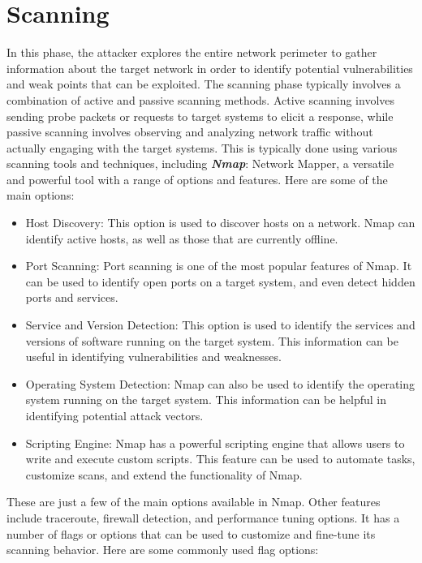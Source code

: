 \documentclass[a4paper, 12pt, oneside]{extbook}
\begin{document}
\chapter{Scanning}
In this phase, the attacker explores the entire network perimeter to gather information about 
the target network in order to identify potential vulnerabilities and weak points that can be exploited.  
\newline The scanning phase typically involves a combination of active and passive scanning methods. Active scanning involves 
sending probe packets or requests to target systems to elicit a response, while passive scanning involves observing and analyzing network traffic without actually engaging with the target systems. 
This is typically done using various scanning tools and techniques, including \textbf{\textit{Nmap}}: Network Mapper, a versatile and powerful tool with a range of options and features. 
Here are some of the main options:
\begin{itemize}
  \item Host Discovery: This option is used to discover hosts on a network. Nmap can identify active hosts, as well as those that are currently offline.
  \item Port Scanning: Port scanning is one of the most popular features of Nmap. It can be used to identify open ports on a target system, and even detect hidden ports and services.
  \item Service and Version Detection: This option is used to identify the services and versions of software running on the target system. This information can be useful in identifying vulnerabilities and weaknesses.
  \item Operating System Detection: Nmap can also be used to identify the operating system running on the target system. This information can be helpful in identifying potential attack vectors.
  \item Scripting Engine: Nmap has a powerful scripting engine that allows users to write and execute custom scripts. This feature can be used to automate tasks, customize scans, and extend the functionality of Nmap.
\end{itemize} 
These are just a few of the main options available in Nmap. Other features include traceroute, firewall detection, and performance tuning options.
It has a number of flags or options that can be used to customize and fine-tune its scanning behavior.
\newline Here are some commonly used flag options:
\end{document}
